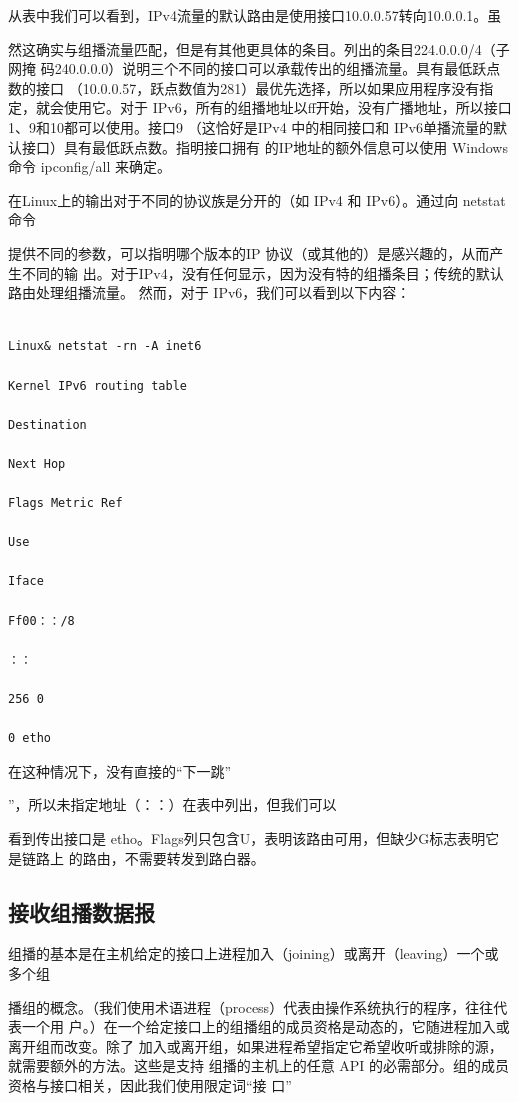 从表中我们可以看到，IPv4流量的默认路由是使用接口10.0.0.57转向10.0.0.1。虽

然这确实与组播流量匹配，但是有其他更具体的条目。列出的条目224.0.0.0/4（子网掩
码240.0.0.0）说明三个不同的接口可以承载传出的组播流量。具有最低跃点数的接口
（10.0.0.57，跃点数值为281）最优先选择，所以如果应用程序没有指定，就会使用它。对于
IPv6，所有的组播地址以ff开始，没有广播地址，所以接口1、9和10都可以使用。接口9
（这恰好是IPv4 中的相同接口和 IPv6单播流量的默认接口）具有最低跃点数。指明接口拥有
的IP地址的额外信息可以使用 Windows 命令 ipconfig/all 来确定。

在Linux上的输出对于不同的协议族是分开的（如 IPv4 和 IPv6）。通过向 netstat 命令

提供不同的参数，可以指明哪个版本的IP 协议（或其他的）是感兴趣的，从而产生不同的输
出。对于IPv4，没有任何显示，因为没有特的组播条目；传统的默认路由处理组播流量。
然而，对于 IPv6，我们可以看到以下内容：

\begin{verbatim}
    
Linux& netstat -rn -A inet6

Kernel IPv6 routing table

Destination

Next Hop

Flags Metric Ref

Use

Iface

Ff00：：/8

：：

256 0

0 etho
\end{verbatim}

在这种情况下，没有直接的“下一跳”

”，所以未指定地址（：：）在表中列出，但我们可以

看到传出接口是 etho。Flags列只包含U，表明该路由可用，但缺少G标志表明它是链路上
的路由，不需要转发到路白器。

\subsection{接收组播数据报}
组播的基本是在主机给定的接口上进程加入（joining）或离开（leaving）一个或多个组

播组的概念。（我们使用术语进程（process）代表由操作系统执行的程序，往往代表一个用
户。）在一个给定接口上的组播组的成员资格是动态的，它随进程加入或离开组而改变。除了
加入或离开组，如果进程希望指定它希望收听或排除的源，就需要额外的方法。这些是支持
组播的主机上的任意 API 的必需部分。组的成员资格与接口相关，因此我们使用限定词“接
口”

